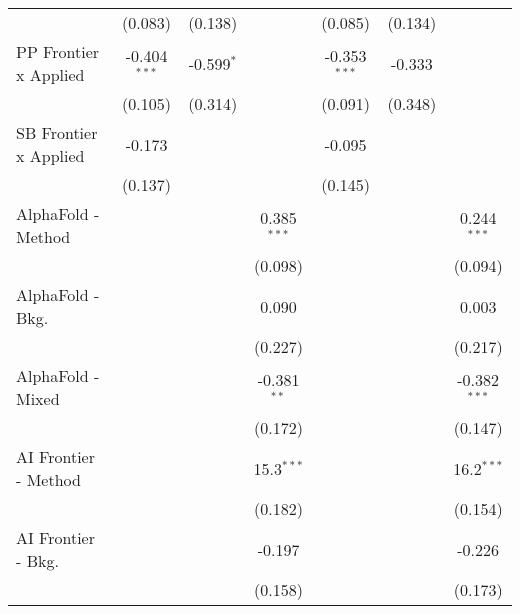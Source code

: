 \begin{tabular}{lcccccc}
                                  & (0.083)        & (0.138)        &                & (0.085)        & (0.134)        &   \\   
   PP Frontier x Applied          & -0.404$^{***}$ & -0.599$^{*}$   &                & -0.353$^{***}$ & -0.333         &   \\   
                                  & (0.105)        & (0.314)        &                & (0.091)        & (0.348)        &   \\   
   SB Frontier x Applied          & -0.173         &                &                & -0.095         &                &   \\   
                                  & (0.137)        &                &                & (0.145)        &                &   \\   
   AlphaFold - Method             &                &                & 0.385$^{***}$  &                &                & 0.244$^{***}$\\   
                                  &                &                & (0.098)        &                &                & (0.094)\\   
   AlphaFold - Bkg.               &                &                & 0.090          &                &                & 0.003\\   
                                  &                &                & (0.227)        &                &                & (0.217)\\   
   AlphaFold - Mixed              &                &                & -0.381$^{**}$  &                &                & -0.382$^{***}$\\   
                                  &                &                & (0.172)        &                &                & (0.147)\\   
   AI Frontier - Method           &                &                & 15.3$^{***}$   &                &                & 16.2$^{***}$\\   
                                  &                &                & (0.182)        &                &                & (0.154)\\   
   AI Frontier - Bkg.             &                &                & -0.197         &                &                & -0.226\\   
                                  &                &                & (0.158)        &                &                & (0.173)\\   

\end{tabular}
